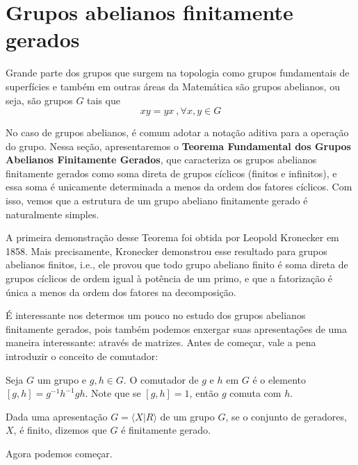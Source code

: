 	\section{Grupos abelianos finitamente gerados}
	\hspace{12pt} Grande parte dos grupos que surgem na topologia como grupos fundamentais de superfícies e também em outras áreas da Matemática são grupos abelianos, ou seja, são grupos $G$ tais que
	\begin{equation*}
	xy = yx\ , \forall x,y\in G
	\end{equation*}
	\par\vspace{0.3cm} No caso de grupos abelianos, é comum adotar a notação aditiva para a operação do grupo. Nessa seção, apresentaremos o \textbf{Teorema Fundamental dos Grupos Abelianos Finitamente Gerados}, que caracteriza os grupos abelianos finitamente gerados como soma direta de grupos cíclicos (finitos e infinitos), e essa soma é unicamente determinada a menos da ordem dos fatores cíclicos. Com isso, vemos que a estrutura de um grupo abeliano finitamente gerado é naturalmente simples. 
	\par\vspace{0.3cm} A primeira demonstração desse Teorema foi obtida por Leopold Kronecker em 1858. Mais precisamente, Kronecker demonstrou esse resultado para grupos abelianos finitos, i.e., ele provou que todo grupo abeliano finito é soma direta de grupos cíclicos de ordem igual à potência de um primo, e que a fatorização é única a menos da ordem dos fatores na decomposição.
	\par\vspace{0.3cm} É interessante nos determos um pouco no estudo dos grupos abelianos finitamente gerados, pois também podemos enxergar suas apresentações de uma maneira interessante: através de matrizes. Antes de começar, vale a pena introduzir o conceito de comutador:
	\begin{deff}
		\label{def comutador}
		Seja $G$ um grupo e $g,h\in G$. O comutador de $g$ e $h$ em $G$ é o elemento $[g,h] = g^{-1}h^{-1}gh$. Note que se $[g,h]=1$, então $g$ comuta com $h$.
	\end{deff}
	\begin{deff}
		\label{def grupo finitamente gerado}
		Dada uma apresentação $G = \langle  X|R \rangle$ de um grupo $G$, se o conjunto de geradores, $X$, é finito, dizemos que $G$ é finitamente gerado.
	\end{deff}
	\par\vspace{0.3cm} Agora podemos começar.
